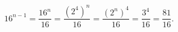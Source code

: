 $16^{n-1}=\dfrac{16^n}{16}=\dfrac{\left(2^4\right)^n}{16}=\dfrac{\left(2^n\right)^4}{16}=\dfrac{3^4}{16}=\boxed{\dfrac{81}{16}}.$
